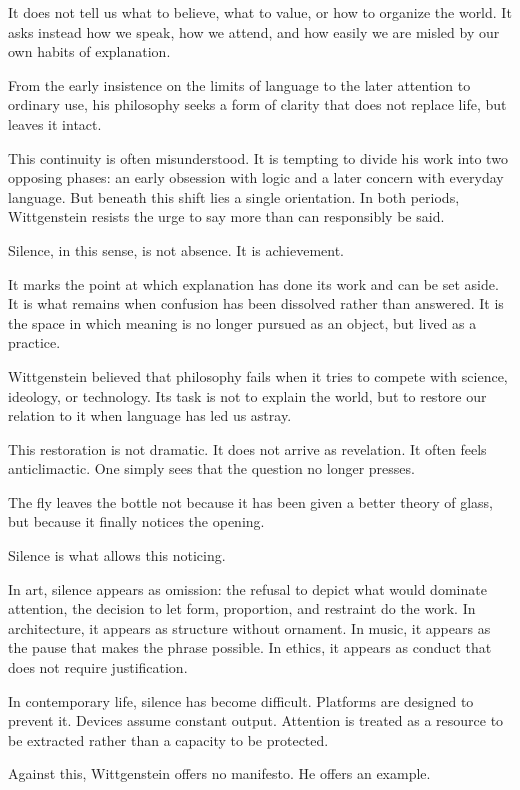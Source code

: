 \documentclass[11pt]{article}
\begin{document}
It does not tell us what to believe, what to value, or how to organize the world. It asks instead how we speak, how we attend, and how easily we are misled by our own habits of explanation.

From the early insistence on the limits of language to the later attention to ordinary use, his philosophy seeks a form of clarity that does not replace life, but leaves it intact.

This continuity is often misunderstood. It is tempting to divide his work into two opposing phases: an early obsession with logic and a later concern with everyday language. But beneath this shift lies a single orientation. In both periods, Wittgenstein resists the urge to say more than can responsibly be said.

Silence, in this sense, is not absence. It is achievement.

It marks the point at which explanation has done its work and can be set aside. It is what remains when confusion has been dissolved rather than answered. It is the space in which meaning is no longer pursued as an object, but lived as a practice.

Wittgenstein believed that philosophy fails when it tries to compete with science, ideology, or technology. Its task is not to explain the world, but to restore our relation to it when language has led us astray.

This restoration is not dramatic. It does not arrive as revelation. It often feels anticlimactic. One simply sees that the question no longer presses.

The fly leaves the bottle not because it has been given a better theory of glass, but because it finally notices the opening.

Silence is what allows this noticing.

In art, silence appears as omission: the refusal to depict what would dominate attention, the decision to let form, proportion, and restraint do the work. In architecture, it appears as structure without ornament. In music, it appears as the pause that makes the phrase possible. In ethics, it appears as conduct that does not require justification.

In contemporary life, silence has become difficult. Platforms are designed to prevent it. Devices assume constant output. Attention is treated as a resource to be extracted rather than a capacity to be protected.

Against this, Wittgenstein offers no manifesto. He offers an example.
\end{document}
